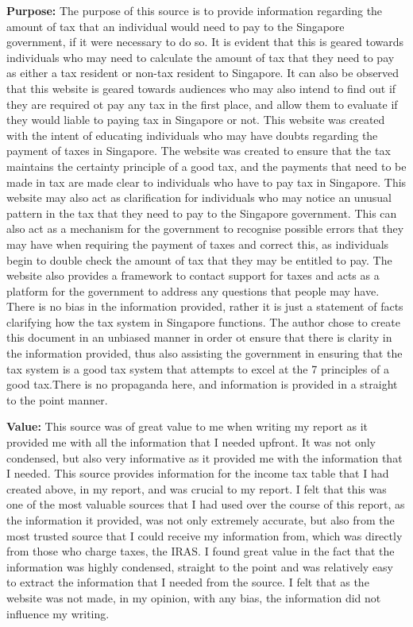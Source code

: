 \documentclass[12pt, a4paper]{article}
\begin{document}
		
			\textbf{Purpose:}
			\newline
			The purpose of this source is to provide information regarding the amount of tax that an individual would need to pay to the Singapore government, if it were necessary to do so.  It is evident that this is geared towards individuals who may need to calculate the amount of tax that they need to pay as either a tax resident or non-tax resident to Singapore. It can also be observed that this website is geared towards audiences who may also intend to find out if they are required ot pay any tax in the first place, and allow them to evaluate if they would liable to paying tax in Singapore or not. This website was created with the intent of educating individuals who may have doubts regarding the payment of taxes in Singapore. The website was created to ensure that the tax maintains the certainty principle of a good tax, and the payments that need to be made in tax are made clear to individuals who have to pay tax in Singapore. This website may also act as clarification for individuals who may notice an unusual pattern in the tax that they need to pay to the Singapore government. This can also act as a mechanism for the government to recognise possible errors that they may have when requiring the payment of taxes and correct this, as individuals begin to double check the amount of tax that they may be entitled to pay. The website also provides a framework to contact support for taxes and acts as a platform for the government to address any questions that people may have. There is no bias in the information provided, rather it is just a statement of facts clarifying how the tax system in Singapore functions. The author chose to create this document in an unbiased manner in order ot ensure that there is clarity in the information provided, thus also assisting the government in ensuring that the tax system is a good tax system that attempts to excel at the 7 principles of a good tax.There is no propaganda here, and information is provided in a straight to the point manner.
			\newline
			‌
			
			\textbf{Value:}	
			\newline
			This source was of great value to me when writing my report as it provided me with all the information that I needed upfront. It was not only condensed, but also very informative as it provided me with the information that I needed. This source provides information for the income tax table that I had created above, in my report, and was crucial to my report. I felt that this was one of the most valuable sources that I had used over the course of this report, as the information it provided, was not only extremely accurate, but also from the most trusted source that I could receive my information from, which was directly from those who charge taxes, the IRAS. I found great value in the fact that the information was highly condensed, straight to the point and was relatively easy to extract the information that I needed from the source. I felt that as the website was not made, in my opinion, with any bias, the information did not influence my writing.
			\newline
			
\end{document}
